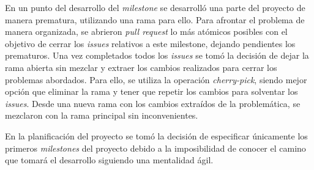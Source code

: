 En un punto del desarrollo del \emph{milestone} se desarrolló una parte del proyecto de manera prematura, utilizando una rama para ello. Para afrontar el problema de manera organizada, se abrieron \emph{pull request} lo más atómicos posibles con el objetivo de cerrar los \emph{issues} relativos a este milestone, dejando pendientes los prematuros. Una vez completados todos los \emph{issues} se tomó la decisión de dejar la rama abierta sin mezclar y extraer los cambios realizados para cerrar los problemas abordados. Para ello, se utiliza la operación \emph{cherry-pick}, siendo mejor opción que eliminar la rama y tener que repetir los cambios para solventar los \emph{issues}. Desde una nueva rama con los cambios extraídos de la problemática, se mezclaron con la rama principal sin inconvenientes.

En la planificación del proyecto se tomó la decisión de especificar únicamente los primeros \emph{milestones} del proyecto debido a la imposibilidad de conocer el camino que tomará el desarrollo siguiendo una mentalidad ágil.